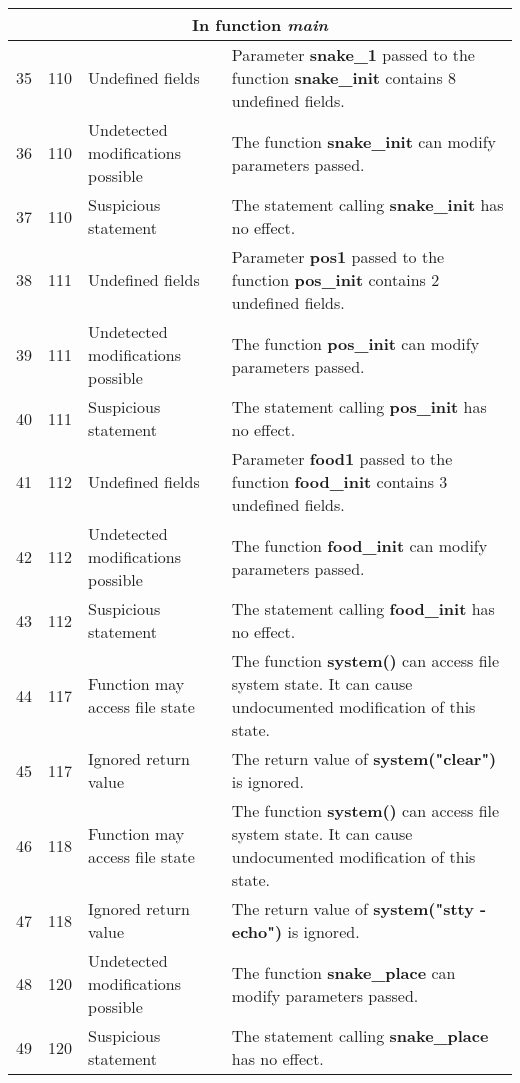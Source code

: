 \documentclass[]{article}
\begin{document}
\begin{longtable}{ |p{0.5cm}|p{0.75cm}|p{3cm}|p{9cm}|  }
 		\hline 
	 	\multicolumn{4}{|c|}{In function \textit{main}} \\
		\hline 
		35 & 110 & Undefined fields & Parameter \textbf{snake\_1} passed to the function \textbf{snake\_init} contains 8 undefined fields. \\
		\hline 
		36 & 110 & Undetected modifications possible & The function \textbf{snake\_init} can modify parameters passed. \\
		\hline 
		37 & 110 & Suspicious statement & The statement calling \textbf{snake\_init} has no effect. \\
		\hline 
		38 & 111 & Undefined fields & Parameter \textbf{pos1} passed to the function \textbf{pos\_init} contains 2 undefined fields. \\
		\hline 
		39 & 111 & Undetected modifications possible & The function \textbf{pos\_init} can modify parameters passed. \\
		\hline 
		40 & 111 & Suspicious statement & The statement calling \textbf{pos\_init} has no effect. \\
		\hline 
		41 & 112 & Undefined fields & Parameter \textbf{food1} passed to the function \textbf{food\_init} contains 3 undefined fields. \\
		\hline 
		42 & 112 & Undetected modifications possible & The function \textbf{food\_init} can modify parameters passed. \\
		\hline 
		43 & 112 & Suspicious statement & The statement calling \textbf{food\_init} has no effect. \\
		\hline 
		44 & 117 & Function may access file state & The function \textbf{system()} can access file system state. It can cause undocumented modification of this state. \\
		\hline 
		45 & 117 & Ignored return value & The return value of \textbf{system("clear")} is ignored. \\
		\hline 
		46 & 118 & Function may access file state & The function \textbf{system()} can access file system state. It can cause undocumented modification of this state. \\
		\hline 
		47 & 118 & Ignored return value & The return value of \textbf{system("stty -echo")} is ignored. \\
		\hline 
		48 & 120 & Undetected modifications possible & The function \textbf{snake\_place} can modify parameters passed. \\
		\hline 
		49 & 120 & Suspicious statement & The statement calling \textbf{snake\_place} has no effect. \\

\end{longtable}
\end{document}
